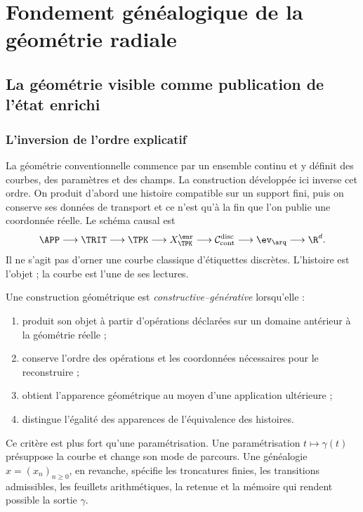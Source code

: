 \part{Fondement généalogique de la géométrie radiale}

\chapter{La géométrie visible comme publication de l'état enrichi}

\section{L'inversion de l'ordre explicatif}

La géométrie conventionnelle commence par un ensemble continu et y définit des courbes, des paramètres et des champs. La construction développée ici inverse cet ordre. On produit d'abord une histoire compatible sur un support fini, puis on conserve ses données de transport et ce n'est qu'à la fin que l'on publie une coordonnée réelle. Le schéma causal est
\begin{equation}
 \APP\longrightarrow\TRIT\longrightarrow\TPK
 \longrightarrow X_{\TPK}^{\enr}
 \longrightarrow\mathcal C_{\mathrm{cont}}^{\mathrm{disc}}
 \longrightarrow\ev_{\arq}
 \longrightarrow\R^d.
 \label{espiral:eq:cadena-genealogica-espiral}
\end{equation}
Il ne s'agit pas d'orner une courbe classique d'étiquettes discrètes. L'histoire est l'objet ; la courbe est l'une de ses lectures.

\begin{definition}
Une construction géométrique est \emph{constructive--générative} lorsqu'elle :
\begin{enumerate}
\item produit son objet à partir d'opérations déclarées sur un domaine antérieur à la géométrie réelle ;
\item conserve l'ordre des opérations et les coordonnées nécessaires pour le reconstruire ;
\item obtient l'apparence géométrique au moyen d'une application ultérieure ;
\item distingue l'égalité des apparences de l'équivalence des histoires.
\end{enumerate}
\end{definition}

Ce critère est plus fort qu'une paramétrisation. Une paramétrisation \(t\mapsto\gamma(t)\) présuppose la courbe et change son mode de parcours. Une généalogie \(x=(x_n)_{n\ge0}\), en revanche, spécifie les troncatures finies, les transitions admissibles, les feuillets arithmétiques, la retenue et la mémoire qui rendent possible la sortie \(\gamma\).

